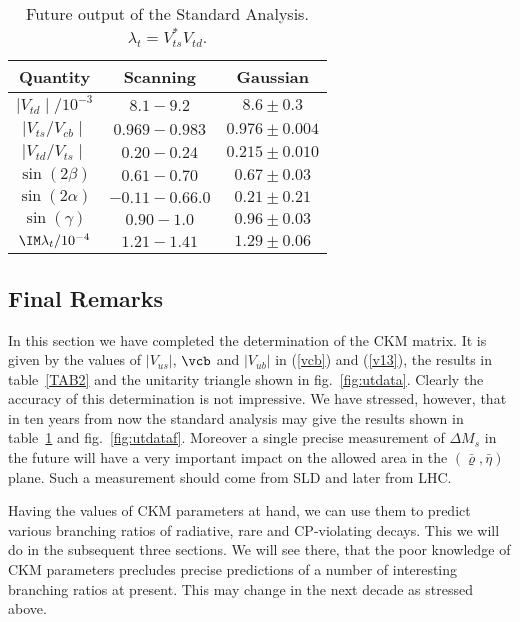 \begin{table}[thb]
\caption[]{Future output of the Standard Analysis. 
 $\lambda_t=V^*_{ts} V_{td}$.\label{TAB3}}
\vspace{0.4cm}
\begin{center}
\begin{tabular}{|c||c||c|}\hline
{\bf Quantity} & {\bf Scanning} & {\bf Gaussian} \\ \hline
$\mid V_{td}\mid/10^{-3}$ &$8.1 - 9.2$ &$ 8.6\pm 0.3$ \\ \hline
$\mid V_{ts}/V_{cb}\mid$ &$0.969 - 0.983$ &$0.976\pm 0.004$  \\ \hline
$\mid V_{td}/V_{ts}\mid$ &$0.20 - 0.24$ &$0.215\pm 0.010$  \\ \hline
$\sin(2\beta)$ &$0.61 - 0.70$ &$ 0.67\pm0.03 $ \\ \hline
$\sin(2\alpha)$ &$-0.11 - 0.66.0$ &$ 0.21\pm 0.21 $ \\ \hline
$\sin(\gamma)$ &$0.90 - 1.0 $ &$ 0.96\pm0.03 $ \\ \hline
$\IM \lambda_t/10^{-4}$ &$1.21 - 1.41 $ &$ 1.29\pm 0.06 $ \\ \hline
\end{tabular}
\end{center}
\end{table}
\subsection{Final Remarks}
In this section we have completed the determination of the CKM matrix.
It is given by the values of $|V_{us}|$, $\vcb$ and $|V_{ub}|$ in
(\ref{vcb}) and (\ref{v13}), the results in table~\ref{TAB2} and
the unitarity triangle shown in fig.~\ref{fig:utdata}. Clearly
the accuracy of this determination is not impressive. We have
stressed, however, that in ten years from now the standard analysis
may give the results shown in table~\ref{TAB3} and fig.~\ref{fig:utdataf}.
Moreover a single precise measurement of $\Delta M_s$ in the future
will have a very important impact on the allowed area in the 
$(\bar\varrho,\bar\eta)$ plane. Such a measurement should come from
SLD and later from LHC.

Having the values of CKM parameters at hand, we can use them to predict
various branching ratios of radiative, rare and CP-violating decays.
This we will do in the subsequent three sections. We will see there,
that the poor knowledge of CKM parameters precludes precise predictions of
a number of interesting branching ratios at present. This may change in
the next decade as stressed above.

